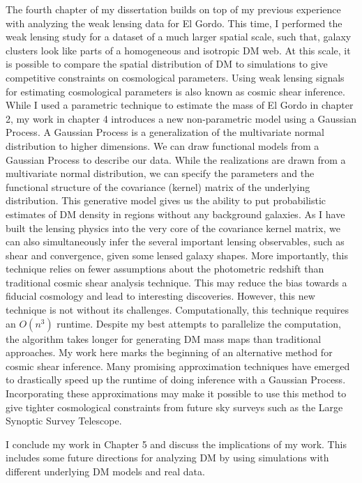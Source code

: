 			The fourth chapter of my dissertation builds on top of my previous experience
			with analyzing the weak lensing data for El Gordo. This time, I performed 
			the weak lensing study for a dataset of a much larger spatial scale, 
			such that, galaxy
		clusters look like parts of a homogeneous and isotropic DM web. At this scale,
		it is possible to compare the spatial distribution of DM to simulations to give 
		competitive constraints on cosmological parameters. Using weak lensing
		signals for estimating cosmological parameters is also known as cosmic shear 
		inference. While I used a parametric technique to estimate the mass of El
		Gordo in chapter 2, 
		my work in chapter 4 introduces a new non-parametric model using a Gaussian Process.
		A Gaussian Process is a generalization of the multivariate normal distribution 
		to higher dimensions. We can draw functional models from a Gaussian Process
		to describe our data. While the realizations are drawn from a multivariate
		normal distribution,  we can specify the parameters and the
		functional structure of the covariance (kernel) matrix of the underlying 
		distribution. 
		This generative model gives us the ability to put probabilistic estimates 
		of DM density in regions without any background galaxies. 
		As I have built the lensing physics into the 
		very core of the covariance kernel matrix, we can also simultaneously infer the
		several important lensing observables, such as shear and convergence, 
		given some lensed galaxy shapes. 
		More importantly, this technique relies on fewer assumptions about the
		photometric redshift than traditional cosmic shear analysis technique. 
		This may reduce
		the bias towards a fiducial cosmology and lead to interesting discoveries.
		However, this new technique is not without its challenges. Computationally,
		this technique requires an $O(n^3)$ runtime. Despite my best attempts to
		parallelize the computation, the algorithm takes longer for
	  generating DM mass maps than traditional approaches. My work here
		marks the beginning of an alternative method for cosmic
		shear inference. Many promising approximation techniques have emerged to 
		drastically speed up the runtime of doing inference with a Gaussian Process.
		Incorporating these approximations may make it possible to use this method 
		to give tighter cosmological constraints  
		from future sky surveys such as the Large Synoptic Survey Telescope.  

		I conclude my work in Chapter 5 and discuss the implications of my work.
		This includes some future directions for analyzing DM
		by using simulations with different underlying DM
		models and real data. 
     
    \newpage
		
